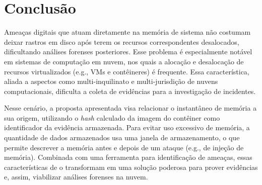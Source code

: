 \chapter{Conclusão}
\label{sec:proposta-concl}

%
Ameaças digitais que atuam diretamente na memória de sistema não costumam deixar rastros em disco após terem os recursos correspondentes desalocados, dificultando análises forenses posteriores.
%
Esse problema é especialmente notável em sistemas de computação em nuvem, nos quais a alocação e desalocação de recursos virtualizados (e.g., VMs e contêineres) é frequente.
%
Essa característica, aliada a aspectos como multi-inquilinato e multi-jurisdição de nuvens computacionais, dificulta a coleta de evidências para a investigação de incidentes.


Nesse cenário, a proposta apresentada visa relacionar o instantâneo de memória a sua origem, utilizando o \textit{hash} calculado da imagem do contêiner como identificador da evidência armazenada.
%
Para evitar uso excessivo de memória, a quantidade de dados armazenados usa uma janela de armazenamento, o que permite descrever a memória antes e depois de um ataque (e.g., de injeção de memória). 
%
Combinada com uma ferramenta para identificação de ameaças, essas características de \fancyname o transformam em uma solução poderosa para prover evidências e, assim, viabilizar análises forenses na nuvem.
%
%
%


